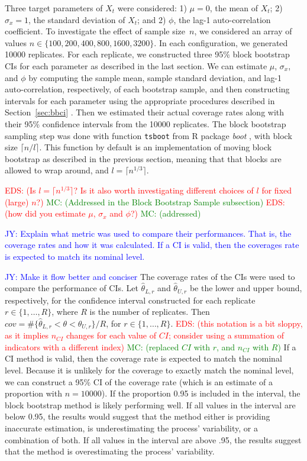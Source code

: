 \documentclass[12pt, letterpaper, titlepage]{article}
\newcommand{\jy}[1]{\textcolor{blue}{JY: #1}}
\newcommand{\eds}[1]{\textcolor{red}{EDS: (#1)}}
\newcommand{\mc}[1]{\textcolor{green}{MC: (#1)}}
\begin{document}
Three target parameters of $X_t$ were considered:
1) $\mu = 0$, the mean of $X_t$;
2) $\sigma_x = 1$, the standard deviation of $X_t$; and
2) $\phi$, the lag-1 auto-correlation coefficient.
To investigate the effect of sample size~$n$, we considered an array of values
$n \in \{100, 200, 400, 800, 1600, 3200\}$. In each configuration, we generated 10000
replicates. For each replicate, we constructed three 95\% block bootstrap
CIs for each parameter as described in the last section. We can estimate 
$\mu$, $\sigma_x$, and $\phi$ by computing the sample mean, sample 
standard deviation,
and lag-1 auto-correlation, respectively, of each bootstrap sample, and then 
constructing intervals for each parameter using the appropriate procedures
described in Section~\ref{sec:bbci} .
Then we estimated their actual coverage rates along with their 95\% confidence
intervals from the 10000 replicates. The block bootstrap sampling step was done
with function \texttt{tsboot} from R package \textsl{boot} \citep{boot}, with
block size $\lceil n / l \rceil$. This function by default is an implementation
of moving block bootstrap as described in the previous section, meaning that
that blocks are allowed to wrap around, and $l = \lceil n^{1/3} \rceil$.

\eds{Is $l = \lceil n^{1/3} \rceil$? Is it also worth investigating different 
choices of $l$ for fixed (large) $n$?}
\mc{Addressed in the Block Bootstrap Sample subsection}
\eds{how did you estimate $\mu$, $\sigma_x$ and $\phi$?}
\mc{addressed}

\jy{Explain what metric was used to compare their performances. That is, the
  coverage rates and how it was calculated. If a CI is valid, then the coverages
  rate is expected to match its nominal level.}

\jy{Make it flow better and conciser}
The coverage rates of the CIs were used to compare the performance of CIs. Let
$\hat\theta_{L, r}$ and $\hat\theta_{U, r}$ be the lower and upper bound,
respectively, for the confidence interval constructed for each replicate
$r \in \{1, \ldots, R\}$, where $R$ is the
number of replicates.
Then $cov = \#\{\hat\theta_{L, r} < \theta < \hat\theta_{U, r} \}/R$,  
for $r \in \{1, \ldots, R\}$.
\eds{this notation is a bit sloppy, as it implies $n_{CI}$ changes for each 
value of $CI$; consider using a summation of indicators with a different index}
\mc{replaced $CI$ with $r$, and $n_{CI}$ with $R$}
If a CI method is valid, then the coverage rate is expected to match the
nominal 
level. Because it is unlikely for the coverage to exactly match the nominal
level,
we can construct a 95\% CI of the coverage
rate (which is an estimate of a proportion with $n = 10000$). If the proportion
0.95 is included in the interval, the block bootstrap method is likely
performing
well. If all values in the interval are below 0.95, the results would suggest 
that the
method either is providing inaccurate estimation, is underestimating the
process' variability, or a combination of both. If all values in the interval
are above .95, the results suggest that the method is overestimating the
process' variability.
\end{document}

